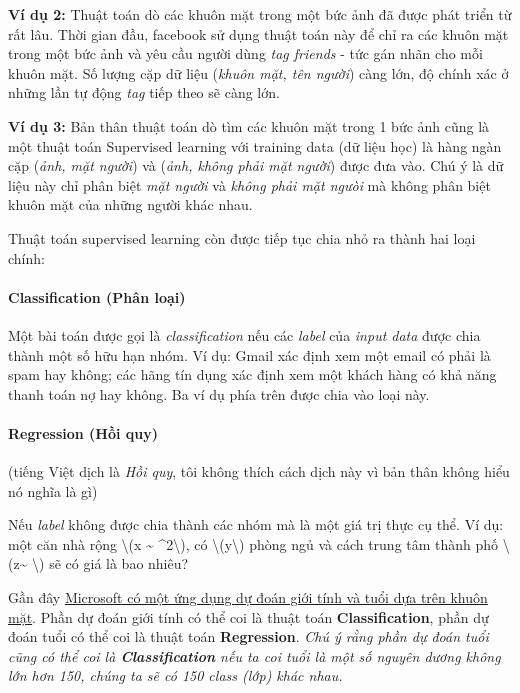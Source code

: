 \textbf{Ví dụ 2:} Thuật toán dò các khuôn mặt trong một bức ảnh đã được
phát triển từ rất lâu. Thời gian đầu, facebook sử dụng thuật toán này để
chỉ ra các khuôn mặt trong một bức ảnh và yêu cầu người dùng \emph{tag
friends} - tức gán nhãn cho mỗi khuôn mặt. Số lượng cặp dữ liệu
(\emph{khuôn mặt, tên người}) càng lớn, độ chính xác ở những lần tự động
\emph{tag} tiếp theo sẽ càng lớn.

\textbf{Ví dụ 3:} Bản thân thuật toán dò tìm các khuôn mặt trong 1 bức
ảnh cũng là một thuật toán Supervised learning với training data (dữ
liệu học) là hàng ngàn cặp (\emph{ảnh, mặt người}) và (\emph{ảnh, không
phải mặt người}) được đưa vào. Chú ý là dữ liệu này chỉ phân biệt
\emph{mặt người} và \emph{không phải mặt ngưòi} mà không phân biệt khuôn
mặt của những người khác nhau.

Thuật toán supervised learning còn được tiếp tục chia nhỏ ra thành hai
loại chính:

\paragraph{Classification (Phân
loại)}\label{classification-phuxe2n-loux1ea1i}

Một bài toán được gọi là \emph{classification} nếu các \emph{label} của
\emph{input data} được chia thành một số hữu hạn nhóm. Ví dụ: Gmail xác
định xem một email có phải là spam hay không; các hãng tín dụng xác định
xem một khách hàng có khả năng thanh toán nợ hay không. Ba ví dụ phía
trên được chia vào loại này.

\paragraph{Regression (Hồi quy)}\label{regression-hux1ed3i-quy}

(tiếng Việt dịch là \emph{Hồi quy}, tôi không thích cách dịch này vì bản
thân không hiểu nó nghĩa là gì)

Nếu \emph{label} không được chia thành các nhóm mà là một giá trị thực
cụ thể. Ví dụ: một căn nhà rộng \textbackslash{}(x \textasciitilde{}
\^{}2\textbackslash{}), có \textbackslash{}(y\textbackslash{})
phòng ngủ và cách trung tâm thành phố
\textbackslash{}(z\textasciitilde{} \textbackslash{}) sẽ có giá
là bao nhiêu?

Gần đây \href{http://how-old.net/}{Microsoft có một ứng dụng dự đoán
giới tính và tuổi dựa trên khuôn mặt}. Phần dự đoán giới tính có thể coi
là thuật toán \textbf{Classification}, phần dự đoán tuổi có thể coi là
thuật toán \textbf{Regression}. \emph{Chú ý rằng phần dự đoán tuổi cũng
có thể coi là \textbf{Classification} nếu ta coi tuổi là một số nguyên
dương không lớn hơn 150, chúng ta sẽ có 150 class (lớp) khác nhau.}

